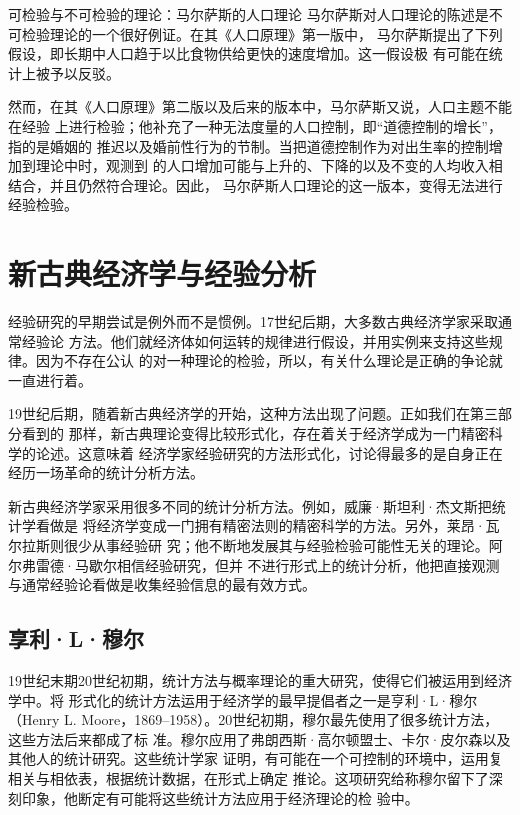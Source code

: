 \begin{mybox}{可检验与不可检验的理论：马尔萨斯的人口理论}
  马尔萨斯对人口理论的陈述是不可检验理论的一个很好例证。在其《人口原理》第一版中，
  马尔萨斯提出了下列假设，即长期中人口趋于以比食物供给更快的速度增加。这一假设极
  有可能在统计上被予以反驳。

  然而，在其《人口原理》第二版以及后来的版本中，马尔萨斯又说，人口主题不能在经验
  上进行检验；他补充了一种无法度量的人口控制，即“道德控制的增长”，指的是婚姻的
  推迟以及婚前性行为的节制。当把道德控制作为对出生率的控制增加到理论中时，观测到
  的人口增加可能与上升的、下降的以及不变的人均收入相结合，并且仍然符合理论。因此，
  马尔萨斯人口理论的这一版本，变得无法进行经验检验。
\end{mybox}

\section{新古典经济学与经验分析}

经验研究的早期尝试是例外而不是惯例。17世纪后期，大多数古典经济学家采取通常经验论
方法。他们就经济体如何运转的规律进行假设，并用实例来支持这些规律。因为不存在公认
的对一种理论的检验，所以，有关什么理论是正确的争论就一直进行着。

19世纪后期，随着新古典经济学的开始，这种方法出现了问题。正如我们在第三部分看到的
那样，新古典理论变得比较形式化，存在着关于经济学成为一门精密科学的论述。这意味着
经济学家经验研究的方法形式化，讨论得最多的是自身正在经历一场革命的统计分析方法。

新古典经济学家采用很多不同的统计分析方法。例如，威廉·斯坦利·杰文斯把统计学看做是
将经济学变成一门拥有精密法则的精密科学的方法。另外，莱昂·瓦尔拉斯则很少从事经验研
究；他不断地发展其与经验检验可能性无关的理论。阿尔弗雷德·马歇尔相信经验研究，但并
不进行形式上的统计分析，他把直接观测与通常经验论看做是收集经验信息的最有效方式。

\subsection{享利·L·穆尔}

19世纪末期20世纪初期，统计方法与概率理论的重大研究，使得它们被运用到经济学中。将
形式化的统计方法运用于经济学的最早提倡者之一是亨利·L·穆尔（Henry L.
Moore，1869--1958）。20世纪初期，穆尔最先使用了很多统计方法，这些方法后来都成了标
准。穆尔应用了弗朗西斯·高尔顿盟士、卡尔·皮尔森以及其他人的统计研究。这些统计学家
证明，有可能在一个可控制的环境中，运用复相关与相依表，根据统计数据，在形式上确定
推论。这项研究给称穆尔留下了深刻印象，他断定有可能将这些统计方法应用于经济理论的检
验中。


